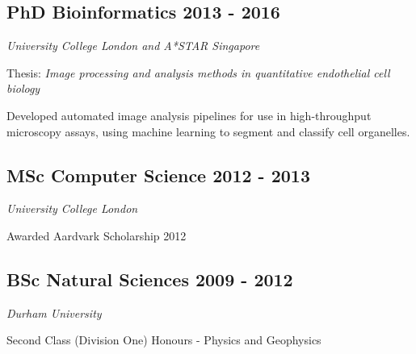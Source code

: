 \subsection{PhD Bioinformatics \hfill 2013 - 2016}
\textsl{University College London and A*STAR Singapore}
\begin{list2}
    \item Thesis: \emph{Image processing and analysis methods in quantitative endothelial cell biology}
    \item Developed automated image analysis pipelines for use in high-throughput microscopy assays, using machine learning to segment and classify cell organelles.
\end{list2}

\subsection{MSc Computer Science \hfill 2012 - 2013}
\textsl{University College London}
\begin{list2}
    \item Awarded Aardvark Scholarship 2012
\end{list2}

\subsection{BSc Natural Sciences \hfill 2009 - 2012}
\textsl{Durham University}
\begin{list2}
    \item Second Class (Division One) Honours - Physics and Geophysics
\end{list2}

